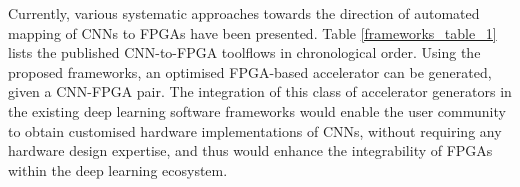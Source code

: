 \documentclass[format=acmsmall, review=false, screen=true]{acmart}
\begin{document}
Currently, various systematic approaches towards the direction of automated mapping of CNNs to FPGAs have been presented. Table \ref{frameworks_table_1} lists the published CNN-to-FPGA toolflows in chronological order. Using the proposed frameworks, an optimised FPGA-based accelerator can be generated, given a CNN-FPGA pair. The integration of this class of accelerator generators in the existing deep learning software frameworks would enable the user community to obtain customised hardware implementations of CNNs, without requiring any hardware design expertise, and thus would enhance the integrability of FPGAs within the deep learning ecosystem.

\begin{table}[t]
\centering
\vspace{-0.2cm}
\caption{CNN-to-FPGA Toolflows %
}
\vspace{-0.25cm}
\label{frameworks_table_1}
\end{table}
\end{document}
